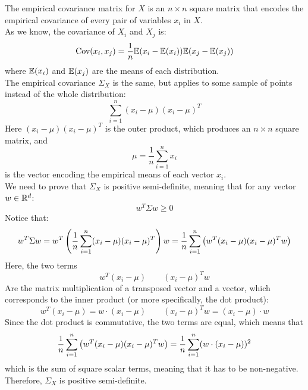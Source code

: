 \documentclass[12pt]{article}
\begin{document}
\begin{enumerate}[label=\alph*)]
        The empirical covariance matrix for $X$
        is an $n \times n$ square matrix that
        encodes the empirical covariance of every pair
        of variables $x_i$ in $X$. \\
        As we know, the covariance of $X_i$ and $X_j$
        is:
        \[ \text{Cov}(x_i, x_j) =  
        \dfrac{1}{n}\mathbb{E}(x_i - \mathbb{E}(x_i))\mathbb{E}(x_j - \mathbb{E}(x_j)) \]
        where $\mathbb{E}(x_i)$ and $\mathbb{E}(x_j)$
        are the means of each distribution. \\
        The empirical covariance $\Sigma_X$
        is the same,
        but applies to some sample of points
        instead of the whole distribution:
        \[ \sum_{i = 1}^{n}(x_i - \mu)(x_i-\mu)^T \]
        Here $(x_i - \mu)(x_i-\mu)^T$
        is the outer product,
        which produces an $n \times n$ square matrix,
        and
        \[\mu = \dfrac{1}{n}\sum_{i=1}^{n}x_i \]
        is the vector encoding the empirical
        means of each vector $x_i$. \\
        We need to prove that $\Sigma_X$
        is positive semi-definite,
        meaning that for any vector $w \in \mathbb{R}^d$:
        \[ w^T\Sigma w \geq 0 \]
        Notice that:
        \[ w^T\Sigma w = w^T \left( 
            \dfrac{1}{n}\sum_{i = 1}^{n}(x_i - \mu)
            (x_i-\mu)^T  \right) w
        =  \dfrac{1}{n}\sum_{i = 1}^{n} \left( 
        w^T (x_i - \mu)(x_i-\mu)^T w  \right) \]
        Here, the two terms
        \[ w^T (x_i - \mu) \qquad (x_i-\mu)^T w \]
        Are the matrix multiplication
        of a transposed vector and a vector,
        which corresponds to the inner product
        (or more specifically, the dot product):
        \[ w^T (x_i - \mu) = w \cdot (x_i - \mu)
        \qquad (x_i-\mu)^T w = (x_i - \mu) \cdot w \]
        Since the dot product is commutative,
        the two terms are equal,
        which means that 
        \[ \dfrac{1}{n}\sum_{i = 1}^{n} \left( 
            w^T (x_i - \mu)(x_i-\mu)^T w  \right)
        =  \dfrac{1}{n}\sum_{i = 1}^{n}
            (w\cdot(x_i - \mu))^2 \]
        which is the sum of square scalar terms,
        meaning that it has to be non-negative. \\
        Therefore, 
        $\Sigma_X$ is positive semi-definite. \\

    \end{enumerate}

    \begingroup
    \color{red}
\end{document}

